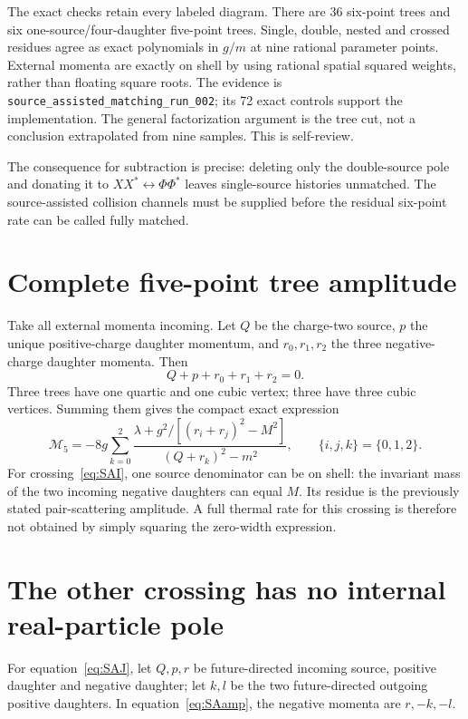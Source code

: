 \documentclass[11pt]{article}
\begin{document}
The exact checks retain every labeled diagram. There are 36 six-point
trees and six one-source/four-daughter five-point trees. Single, double,
nested and crossed residues agree as exact polynomials in $g/m$ at nine
rational parameter points. External momenta are exactly on shell by using
rational spatial squared weights, rather than floating square roots.
The evidence is \texttt{source\_assisted\_matching\_run\_002}; its 72
exact controls support the implementation. The general factorization
argument is the tree cut, not a conclusion extrapolated from nine samples.
This is self-review.

The consequence for subtraction is precise: deleting only the double-source
pole and donating it to $XX^*\leftrightarrow\Phi\Phi^*$ leaves single-source
histories unmatched. The source-assisted collision channels must be supplied
before the residual six-point rate can be called fully matched.

\section{Complete five-point tree amplitude}
Take all external momenta incoming. Let $Q$ be the charge-two source,
$p$ the unique positive-charge daughter momentum, and
$r_0,r_1,r_2$ the three negative-charge daughter momenta. Then
\begin{equation}
 Q+p+r_0+r_1+r_2=0.
\end{equation}
Three trees have one quartic and one cubic vertex; three have three cubic
vertices. Summing them gives the compact exact expression
\begin{equation}
 \boxed{\mathcal M_5=-8g\sum_{k=0}^2
 \frac{\lambda+g^2/[(r_i+r_j)^2-M^2]}
 {(Q+r_k)^2-m^2},\qquad \{i,j,k\}=\{0,1,2\}.}
\label{eq:SAamp}
\end{equation}
For crossing~\eqref{eq:SAI}, one source denominator can be on shell:
the invariant mass of the two incoming negative daughters can equal $M$.
Its residue is the previously stated pair-scattering amplitude. A full
thermal rate for this crossing is therefore not obtained by simply squaring
the zero-width expression.

\section{The other crossing has no internal real-particle pole}
For equation~\eqref{eq:SAJ}, let $Q,p,r$ be future-directed incoming
source, positive daughter and negative daughter; let $k,l$ be the two
future-directed outgoing positive daughters. In equation~\eqref{eq:SAamp},
the negative momenta are $r,-k,-l$.
\end{document}
